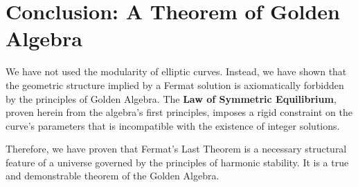 \documentclass{amsart}
\theoremstyle{plain}
\theoremstyle{definition}
\theoremstyle{remark}
\begin{document}
\section{Conclusion: A Theorem of Golden Algebra}

We have not used the modularity of elliptic curves. Instead, we have shown that the geometric structure implied by a Fermat solution is axiomatically forbidden by the principles of Golden Algebra. The \textbf{Law of Symmetric Equilibrium}, proven herein from the algebra's first principles, imposes a rigid constraint on the curve's parameters that is incompatible with the existence of integer solutions.

Therefore, we have proven that Fermat's Last Theorem is a necessary structural feature of a universe governed by the principles of harmonic stability. It is a true and demonstrable theorem of the Golden Algebra.
\end{document}
